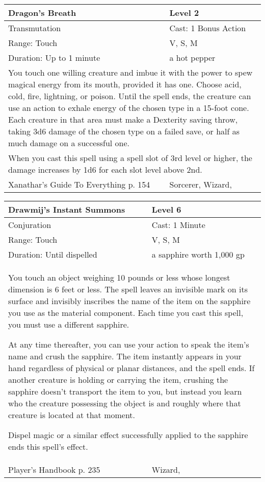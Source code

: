 \documentclass[11pt]{report}
\begin{document}
\begin{table}[H]
	\begin{tabular}{||p{6cm}|p{6cm}||}
		\hline\hline
		\bf{Dragon's Breath} & Level 2\\ \hline
		Transmutation & Cast: 1 Bonus Action\\ \hline
		Range: Touch & V, S, M\\ \hline
		Duration: Up to 1 minute & a hot pepper\\ \hline
		\multicolumn{2}{||p{12cm}||}{You touch one willing creature and imbue it with the power to spew magical energy from its mouth, provided it has one. Choose acid, cold, fire, lightning, or poison. Until the spell ends, the creature can use an action to exhale energy of the chosen type in a 15-foot cone. Each creature in that area must make a Dexterity saving throw, taking 3d6 damage of the chosen type on a failed save, or half as much damage on a successful one.}\\ \hline
		\multicolumn{2}{||p{12cm}||}{When you cast this spell using a spell slot of 3rd level or higher, the damage increases by 1d6 for each slot level above 2nd.}\\ \hline
Xanathar's Guide To Everything p. 154 & Sorcerer, Wizard, \\ \hline\hline
	\end{tabular}
\end{table}

\begin{table}[H]
	\begin{tabular}{||p{6cm}|p{6cm}||}
		\hline\hline
		\bf{Drawmij’s Instant Summons} & Level 6\\ \hline
		Conjuration & Cast: 1 Minute\\ \hline
		Range: Touch & V, S, M \\ \hline
		Duration: Until dispelled & a sapphire worth 1,000 gp\\ \hline
		\multicolumn{2}{||p{12cm}||}{You touch an object weighing 10 pounds or less whose longest dimension is 6 feet or less. 
The spell leaves an invisible mark on its surface and invisibly inscribes the name of the item on the sapphire you use as the material component. Each time you cast this spell, you must use a different sapphire. 

At any time thereafter, you can use your action to speak the item’s name and crush the sapphire. The item instantly appears in your hand regardless of physical or planar distances, and the spell ends. If another creature is holding or carrying the item, crushing the sapphire doesn’t transport the item to you, but instead you learn who the creature possessing the object is and roughly where that creature is located at that moment. 

Dispel magic or a similar effect successfully applied to the sapphire ends this spell’s effect.}\\ \hline
Player's Handbook p. 235 & Wizard, \\ \hline\hline
	\end{tabular}
\end{table}
\end{document}
